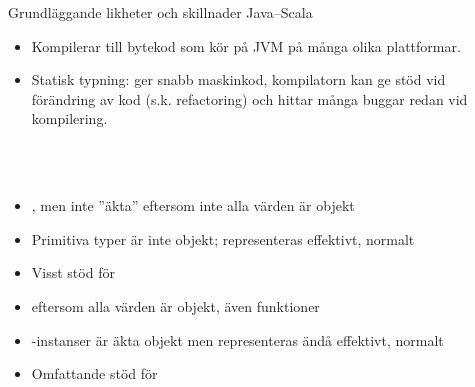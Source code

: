   


\begin{Slide}{Grundläggande likheter och skillnader Java--Scala}\SlideFontSmall
{}
\begin{itemize}\SlideFontTiny
\item Kompilerar till bytekod som kör på JVM på många olika plattformar.
\item Statisk typning: ger snabb maskinkod, kompilatorn kan ge stöd vid förändring av kod (s.k. refactoring) och hittar många buggar redan vid kompilering.
\end{itemize}

\noindent {} 
\ifkompendium
\\~\\
\else
\vspace{-1em}\begin{multicols}{2}
\fi
{}
\begin{itemize}\SlideFontTiny
\item {}, men inte ''äkta''  eftersom inte alla värden är objekt

\item Primitiva typer är inte objekt; representeras effektivt, normalt 

\item Visst stöd för 

\end{itemize}

\ifkompendium\else
\columnbreak
\fi

\noindent{}
\begin{itemize}\SlideFontTiny
\item {} eftersom alla värden är objekt, även funktioner

\item {}-instanser är äkta objekt men representeras ändå effektivt, normalt 

\item Omfattande stöd för 

\end{itemize}
\ifkompendium\else
\end{multicols}
\fi
\end{Slide}



